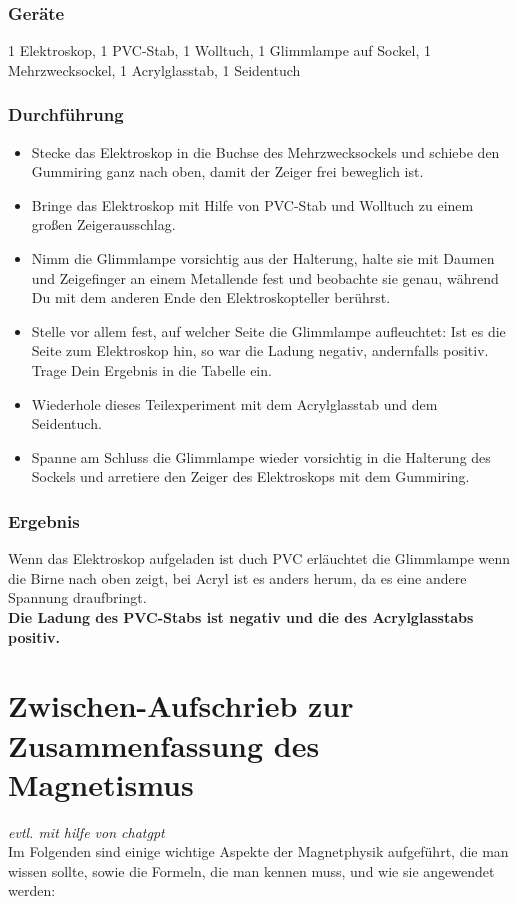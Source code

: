 \documentclass[a4paper]{report}
\begin{document}
\subsubsection{Geräte} 1 Elektroskop, 1 PVC-Stab, 1 Wolltuch, 1 Glimmlampe auf
Sockel, 1 Mehrzwecksockel, 1 Acrylglasstab, 1 Seidentuch
\subsubsection{Durchführung} 
\begin{itemize} 
\item Stecke das Elektroskop in die Buchse des Mehrzwecksockels und schiebe den Gummiring ganz nach oben, damit der Zeiger frei beweglich ist. 
\item Bringe das Elektroskop mit Hilfe von PVC-Stab und Wolltuch zu einem großen Zeigerausschlag. 
\item Nimm die Glimmlampe vorsichtig aus der Halterung, halte sie mit Daumen und Zeigefinger an einem Metallende fest und beobachte sie genau, während Du mit dem anderen Ende den Elektroskopteller berührst. 
\item Stelle vor allem fest, auf welcher Seite die Glimmlampe aufleuchtet: Ist es die Seite zum Elektroskop hin, so war die Ladung negativ, andernfalls positiv. Trage Dein Ergebnis in die Tabelle ein. 
\item Wiederhole dieses Teilexperiment mit dem Acrylglasstab und dem Seidentuch. 
\item Spanne am Schluss die Glimmlampe wieder vorsichtig in die Halterung des Sockels und arretiere den Zeiger des Elektroskops mit dem Gummiring. 
\end{itemize} 
\subsubsection{Ergebnis} Wenn das Elektroskop aufgeladen ist duch PVC erläuchtet die Glimmlampe wenn die Birne nach oben zeigt, bei Acryl ist es anders herum, da es eine andere Spannung draufbringt.\\
  \textbf{ \noindent Die Ladung des PVC-Stabs ist negativ und die des Acrylglasstabs positiv. }

\section{Zwischen-Aufschrieb zur Zusammenfassung des Magnetismus}

\textit{evtl. mit hilfe von chatgpt}\\
Im Folgenden sind einige wichtige Aspekte der Magnetphysik aufgeführt, die man
wissen sollte, sowie die Formeln, die man kennen muss, und wie sie angewendet
werden:
\end{document}
